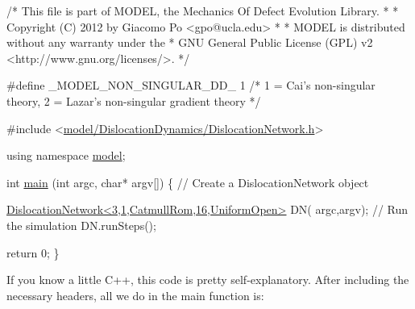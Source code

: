 \begin{DoxyCodeInclude}
\textcolor{comment}{/* This file is part of MODEL, the Mechanics Of Defect Evolution Library.}
\textcolor{comment}{ *}
\textcolor{comment}{ * Copyright (C) 2012 by Giacomo Po <gpo@ucla.edu>}
\textcolor{comment}{ *}
\textcolor{comment}{ * MODEL is distributed without any warranty under the}
\textcolor{comment}{ * GNU General Public License (GPL) v2 <http://www.gnu.org/licenses/>.}
\textcolor{comment}{ */}

\textcolor{preprocessor}{#define \_MODEL\_NON\_SINGULAR\_DD\_ 1 }\textcolor{comment}{/* 1 = Cai's non-singular theory, 2 = Lazar's non-singular gradient
       theory */}\textcolor{preprocessor}{}

\textcolor{preprocessor}{#include <\hyperlink{_dislocation_network_8h}{model/DislocationDynamics/DislocationNetwork.h}>}

\textcolor{keyword}{using namespace }\hyperlink{namespacemodel}{model};

\textcolor{keywordtype}{int} \hyperlink{bench_2bary_search_2main_8cpp_a0ddf1224851353fc92bfbff6f499fa97}{main} (\textcolor{keywordtype}{int} argc, \textcolor{keywordtype}{char}* argv[])
\{
    \textcolor{comment}{// Create a DislocationNetwork object}
        
    \hyperlink{classmodel_1_1_dislocation_network}{DislocationNetwork<3,1,CatmullRom,16,UniformOpen>} DN(
      argc,argv);
    \textcolor{comment}{// Run the simulation}
    DN.runSteps();
    
    \textcolor{keywordflow}{return} 0;
\}

\end{DoxyCodeInclude}
 If you know a little C++, this code is pretty self-\/explanatory. After including the necessary headers, all we do in the main function is\+:
